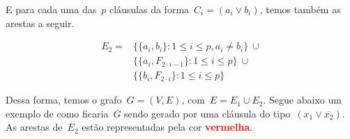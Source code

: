		E para cada uma das~$p$ cláusulas da forma~$C_i=(a_i\lor b_i)$, 
		temos também as arestas a seguir.

		\begin{align}
			E_2=&\{ \{a_i,b_i\}: 1\le i\le p, a_i\ne b_i \}\ \cup 
					\nonumber\\
				&\{\{a_i, F_{2\cdot i-1}\}: 1\le i\le p\}\ \cup \nonumber \\
				&\{\{b_i, F_{2\cdot i}\}: 1\le i\le p\} \nonumber
		\end{align}

		Dessa forma, temos o grafo~${G = (V,E)}$, com~${E=E_1\cup E_2}$.
		Segue abaixo um exemplo de como ficaria~$G$ sendo gerado por
		uma cláusula do tipo~${(x_1\lor \overline{x_2})}$.
		As arestas de~$E_2$ estão representadas pela cor 
		\textcolor{red}{\textbf {vermelha}}.

		\bigskip
		\bigskip


